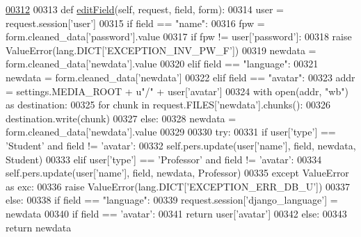 \begin{DoxyCode}
\hypertarget{classProfile_1_1ProfileUnit_1_1BusProfile_l00312}{}\hyperlink{classProfile_1_1ProfileUnit_1_1BusProfile_a5c116d007081ffefcc1c45cd34c88e10}{00312} 
00313     \textcolor{keyword}{def }\hyperlink{classProfile_1_1ProfileUnit_1_1BusProfile_a5c116d007081ffefcc1c45cd34c88e10}{editField}(self, request, field, form):
00314         user = request.session[\textcolor{stringliteral}{'user'}]
00315         \textcolor{keywordflow}{if} field == \textcolor{stringliteral}{"name"}:
00316             fpw = form.cleaned\_data[\textcolor{stringliteral}{'password'}].value
00317             \textcolor{keywordflow}{if} fpw != user[\textcolor{stringliteral}{'password'}]:
00318                 \textcolor{keywordflow}{raise} ValueError(lang.DICT[\textcolor{stringliteral}{'EXCEPTION\_INV\_PW\_F'}])
00319             newdata = form.cleaned\_data[\textcolor{stringliteral}{'newdata'}].value
00320         \textcolor{keywordflow}{elif} field == \textcolor{stringliteral}{"language"}:
00321             newdata = form.cleaned\_data[\textcolor{stringliteral}{'newdata'}]
00322         \textcolor{keywordflow}{elif} field == \textcolor{stringliteral}{"avatar"}:
00323             addr = settings.MEDIA\_ROOT + \textcolor{stringliteral}{u"/"} + user[\textcolor{stringliteral}{'avatar'}]
00324             with open(addr, \textcolor{stringliteral}{"wb"}) \textcolor{keyword}{as} destination:
00325                     \textcolor{keywordflow}{for} chunk \textcolor{keywordflow}{in} request.FILES[\textcolor{stringliteral}{'newdata'}].chunks():
00326                         destination.write(chunk)
00327         \textcolor{keywordflow}{else}:
00328             newdata = form.cleaned\_data[\textcolor{stringliteral}{'newdata'}].value
00329 
00330         \textcolor{keywordflow}{try}:
00331             \textcolor{keywordflow}{if} user[\textcolor{stringliteral}{'type'}] == \textcolor{stringliteral}{'Student'} \textcolor{keywordflow}{and} field != \textcolor{stringliteral}{'avatar'}:
00332                 self.pers.update(user[\textcolor{stringliteral}{'name'}], field, newdata, Student)
00333             \textcolor{keywordflow}{elif} user[\textcolor{stringliteral}{'type'}] == \textcolor{stringliteral}{'Professor'} \textcolor{keywordflow}{and} field != \textcolor{stringliteral}{'avatar'}:
00334                 self.pers.update(user[\textcolor{stringliteral}{'name'}], field, newdata, Professor)
00335         \textcolor{keywordflow}{except} ValueError \textcolor{keyword}{as} exc:
00336             \textcolor{keywordflow}{raise} ValueError(lang.DICT[\textcolor{stringliteral}{'EXCEPTION\_ERR\_DB\_U'}])
00337         \textcolor{keywordflow}{else}:
00338             \textcolor{keywordflow}{if} field == \textcolor{stringliteral}{"language"}:
00339                 request.session[\textcolor{stringliteral}{'django\_language'}] = newdata
00340         \textcolor{keywordflow}{if} field == \textcolor{stringliteral}{'avatar'}:
00341             \textcolor{keywordflow}{return} user[\textcolor{stringliteral}{'avatar'}]
00342         \textcolor{keywordflow}{else}:
00343             \textcolor{keywordflow}{return} newdata

\end{DoxyCode}

